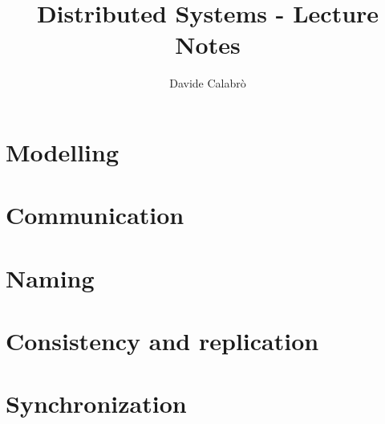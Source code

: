 \documentclass{article}
\title{Distributed Systems - Lecture Notes}
\author{Davide Calabrò}
\begin{document}
    \maketitle
    \newpage
    
    \tableofcontents
    
    \newpage

    \section{Modelling}
    
    
    \newpage
    
    \section{Communication}
    
    
    \newpage
    
    \section{Naming}
    
    
    \newpage
    
    \section{Consistency and replication}
    
    
    \newpage
    
    \section{Synchronization}
    
\end{document}
